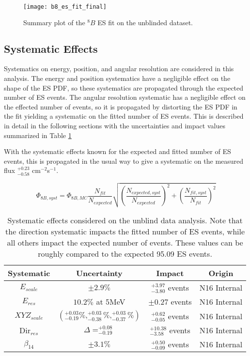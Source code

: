 \begin{figure}
\centering
\texttt{[image: b8\_es\_fit\_final]}
\caption{Summary plot of the $^8B$ ES fit on the unblinded dataset.}
\label{fig:solar:unblind_fit}
\end{figure}


\subsection{Systematic Effects}

Systematics on energy, position, and angular resolution are considered in this 
analysis. 
The energy and position systematics have a negligible effect on the shape of 
the ES PDF, so these systematics are propagated through the expected number of 
ES events. 
The angular resolution systematic has a negligible effect on the effected 
number of events, so it is propagated by distorting the ES PDF in the 
fit yielding a systematic on the fitted number of ES events.
This is described in detail in the following sections with the uncertainties 
and  impact values summarized in Table \ref{tbl:solar:unblind_syst}

With the systematic effects known for the expected and fitted number of ES
events, this is propagated in the usual way to give a systematic on the 
measured flux $^{+0.23}_{-0.58}$ cm$^{-2}$s$^{-1}$.

\begin{equation}
\Phi_{8B,syst} = \Phi_{8B,MC}\frac{N_{fit}}{N_{expected}} \sqrt{
    \left(\frac{N_{expected,syst}}{N_{expected}}\right)^2 +
    \left(\frac{N_{fit,syst}}{N_{fit}}\right)^2
    }
\end{equation}

\begin{table}[]
\begin{center}
\begin{tabular}{c|c|c|c}
Systematic & Uncertainty & Impact & Origin \\ \hline
$E_{scale}$     & $\pm 2.9\%$ & $^{+3.97}_{-3.80}$ events & N16 Internal \rule{0pt}{2.6ex}\rule[-1.2ex]{0pt}{0pt}  \\
$E_{res}$       & $10.2\%$ at 5MeV & $\pm0.27$ events & N16 Internal  \rule{0pt}{2.6ex}\rule[-1.2ex]{0pt}{0pt}  \\
${XYZ}_{scale}$ & $(^{+0.03}_{-0.19}\%,^{+0.03}_{-0.38}\%,^{+0.03}_{-0.37}\%)$ & $^{+0.62}_{-0.05}$ events & N16 Internal  \rule{0pt}{2.6ex}\rule[-1.2ex]{0pt}{0pt}  \\
Dir$_{res}$     &  $\Delta = ^{+0.08}_{-0.19}$ & $^{+10.38}_{-3.58}$ events & N16 Internal \rule{0pt}{2.6ex}\rule[-1.2ex]{0pt}{0pt}  \\
$\beta_{14}$ & $\pm 3.1\%$ & $^{+0.50}_{-0.09}$ events & N16 Internal\\ \hline
\end{tabular}
\caption{Systematic effects considered on the unblind data analysis. Note that
    the direction systematic impacts the fitted number of ES events, while
    all others impact the expected number of events. These values can be roughly
    compared to the expected 95.09 ES events.}
\label{tbl:solar:unblind_syst}
\end{center}
\end{table}

